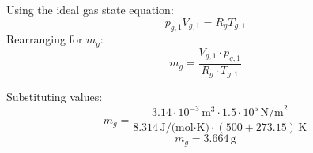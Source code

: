 Using the ideal gas state equation:  
\[
p_{g,1} V_{g,1} = R_g T_{g,1}
\]  
Rearranging for \( m_g \):  
\[
m_g = \frac{V_{g,1} \cdot p_{g,1}}{R_g \cdot T_{g,1}}
\]  

Substituting values:  
\[
m_g = \frac{3.14 \cdot 10^{-3} \, \text{m}^3 \cdot 1.5 \cdot 10^5 \, \text{N/m}^2}{8.314 \, \text{J/(mol·K)} \cdot (500 + 273.15) \, \text{K}}
\]  
\[
m_g = 3.664 \, \text{g}
\]